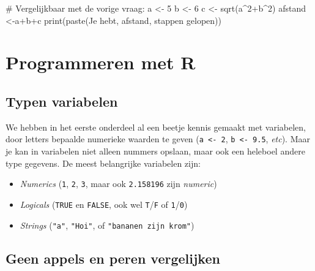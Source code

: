 \documentclass[
  a4paper,
]{scrbook}
\newenvironment{Shaded}{\begin{snugshade}}{\end{snugshade}}
\newcommand{\CommentTok}[1]{\textcolor[rgb]{0.37,0.37,0.37}{#1}}
\newcommand{\DecValTok}[1]{\textcolor[rgb]{0.68,0.00,0.00}{#1}}
\newcommand{\FunctionTok}[1]{\textcolor[rgb]{0.28,0.35,0.67}{#1}}
\newcommand{\NormalTok}[1]{\textcolor[rgb]{0.00,0.23,0.31}{#1}}
\newcommand{\OtherTok}[1]{\textcolor[rgb]{0.00,0.23,0.31}{#1}}
\newcommand{\SpecialCharTok}[1]{\textcolor[rgb]{0.37,0.37,0.37}{#1}}
\newcommand{\StringTok}[1]{\textcolor[rgb]{0.13,0.47,0.30}{#1}}
\theoremstyle{definition}
\theoremstyle{remark}
\begin{document}
\begin{Shaded}
\begin{Highlighting}[]
\CommentTok{\# Vergelijkbaar met de vorige vraag:}
\NormalTok{a }\OtherTok{\textless{}{-}} \DecValTok{5}
\NormalTok{b }\OtherTok{\textless{}{-}} \DecValTok{6}
\NormalTok{c }\OtherTok{\textless{}{-}} \FunctionTok{sqrt}\NormalTok{(a}\SpecialCharTok{\^{}}\DecValTok{2}\SpecialCharTok{+}\NormalTok{b}\SpecialCharTok{\^{}}\DecValTok{2}\NormalTok{)}
\NormalTok{afstand }\OtherTok{\textless{}{-}}\NormalTok{a}\SpecialCharTok{+}\NormalTok{b}\SpecialCharTok{+}\NormalTok{c}
\FunctionTok{print}\NormalTok{(}\FunctionTok{paste}\NormalTok{(}\StringTok{\textquotesingle{}Je hebt\textquotesingle{}}\NormalTok{, afstand, }\StringTok{\textquotesingle{}stappen gelopen\textquotesingle{}}\NormalTok{))}
\end{Highlighting}
\end{Shaded}

\hypertarget{programmeren-met-r}{%
\chapter{Programmeren met R}\label{programmeren-met-r}}

\hypertarget{typen-variabelen}{%
\section{Typen variabelen}\label{typen-variabelen}}

We hebben in het eerste onderdeel al een beetje kennis gemaakt met
variabelen, door letters bepaalde numerieke waarden te geven
(\texttt{a\ \textless{}-\ 2}, \texttt{b\ \textless{}-\ 9.5},
\emph{etc}). Maar je kan in variabelen niet alleen nummers opslaan, maar
ook een heleboel andere type gegevens. De meest belangrijke variabelen
zijn:

\begin{itemize}
\item
  \emph{Numerics} (\texttt{1}, \texttt{2}, \texttt{3}, maar ook
  \texttt{2.158196} zijn \emph{numeric})
\item
  \emph{Logicals} (\texttt{TRUE} en \texttt{FALSE}, ook wel
  \texttt{T}/\texttt{F} of \texttt{1}/\texttt{0})
\item
  \emph{Strings} (\texttt{"a"}, \texttt{"Hoi"}, of
  \texttt{"bananen\ zijn\ krom"})
\end{itemize}

\hypertarget{geen-appels-en-peren-vergelijken}{%
\section{Geen appels en peren
vergelijken}\label{geen-appels-en-peren-vergelijken}}
\end{document}
